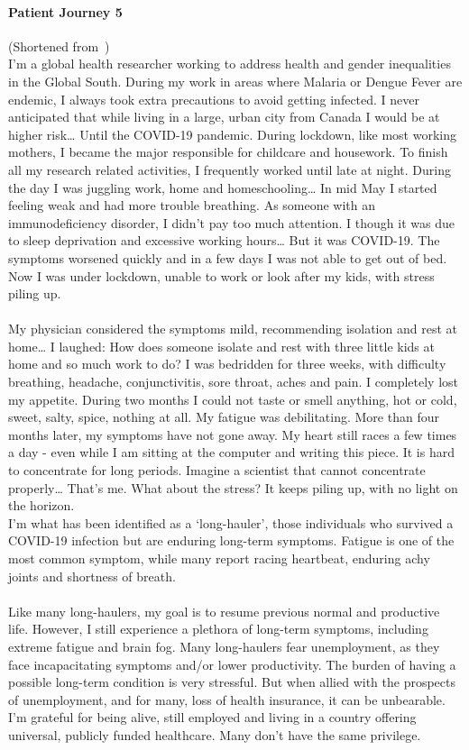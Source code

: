 \paragraph{Patient Journey 5}\label{apx:pj5} (Shortened from~\cite{malta_my_2020})\\
I'm a global health researcher working to address health and gender inequalities in the Global South. During my work in areas where Malaria or Dengue Fever are endemic, I always took extra precautions to avoid getting infected. I never anticipated that while living in a large, urban city from Canada I would be at higher risk… Until the COVID-19 pandemic.
During lockdown, like most working mothers, I became the major responsible for childcare and housework. To finish all my research related activities, I frequently worked until late at night. During the day I was juggling work, home and homeschooling… In mid May I started feeling weak and had more trouble breathing. As someone with an immunodeficiency disorder, I didn't pay too much attention. I though it was due to sleep deprivation and excessive working hours… But it was COVID-19. The symptoms worsened quickly and in a few days I was not able to get out of bed. Now I was under lockdown, unable to work or look after my kids, with stress piling up.\\\\
My physician considered the symptoms mild, recommending isolation and rest at home… I laughed: How does someone isolate and rest with three little kids at home and so much work to do? I was bedridden for three weeks, with difficulty breathing, headache, conjunctivitis, sore throat, aches and pain. I completely lost my appetite. During two months I could not taste or smell anything, hot or cold, sweet, salty, spice, nothing at all. My fatigue was debilitating. More than four months later, my symptoms have not gone away. My heart still races a few times a day - even while I am sitting at the computer and writing this piece. It is hard to concentrate for long periods. Imagine a scientist that cannot concentrate properly… That's me. What about the stress? It keeps piling up, with no light on the horizon.\\
I'm what has been identified as a ‘long-hauler’, those individuals who survived a COVID-19 infection but are enduring long-term symptoms. Fatigue is one of the most common symptom, while many report racing heartbeat, enduring achy joints and shortness of breath.\\\\
Like many long-haulers, my goal is to resume previous normal and productive life. However, I still experience a plethora of long-term symptoms, including extreme fatigue and brain fog. Many long-haulers fear unemployment, as they face incapacitating symptoms and/or lower productivity. The burden of having a possible long-term condition is very stressful. But when allied with the prospects of unemployment, and for many, loss of health insurance, it can be unbearable. I'm grateful for being alive, still employed and living in a country offering universal, publicly funded healthcare. Many don't have the same privilege.

